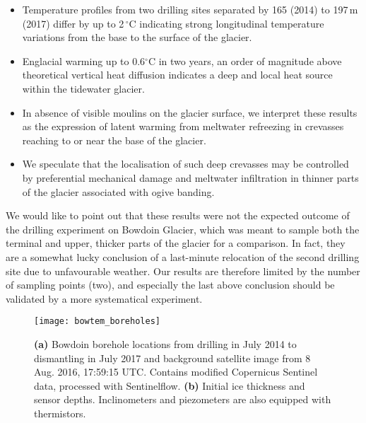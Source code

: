 \documentclass[utf8]{article}
\begin{document}
    \begin{itemize}

      \item Temperature profiles from two drilling sites separated by 165
        (2014) to 197\,m (2017) differ by up to 2\,$^\circ$C indicating strong
        longitudinal temperature variations from the base to the surface of
        the glacier.

      \item Englacial warming up to 0.6$^\circ$C in two years, an order of
        magnitude above theoretical vertical heat diffusion indicates a deep
        and local heat source within the tidewater glacier.

      \item In absence of visible moulins on the glacier surface, we interpret
        these results as the expression of latent warming from meltwater
        refreezing in crevasses reaching to or near the base of the glacier.

      \item We speculate that the localisation of such deep crevasses may be
        controlled by preferential mechanical damage and meltwater infiltration
        in thinner parts of the glacier associated with ogive banding.

    \end{itemize}

    We would like to point out that these results were not the expected outcome
    of the drilling experiment on Bowdoin Glacier, which was meant to sample
    both the terminal and upper, thicker parts of the glacier for a comparison.
    In fact, they are a somewhat lucky conclusion of a last-minute relocation
    of the second drilling site due to unfavourable weather. Our results are
    therefore limited by the number of sampling points (two), and especially
    the last above conclusion should be validated by a more systematical
    experiment.







\clearpage

    \begin{figure}
      \centerline{\texttt{[image: bowtem\_boreholes]}}
      \caption{%
        \textbf{(a)} Bowdoin borehole locations from drilling in July 2014 to
          dismantling in July 2017 and background satellite image from 8 Aug.
          2016, 17:59:15 UTC. Contains modified Copernicus Sentinel data,
          processed with Sentinelflow.
        \textbf{(b)} Initial ice thickness and sensor depths. Inclinometers
          and piezometers are also equipped with thermistors.}
      \label{fig:boreholes}
    \end{figure}
\end{document}
